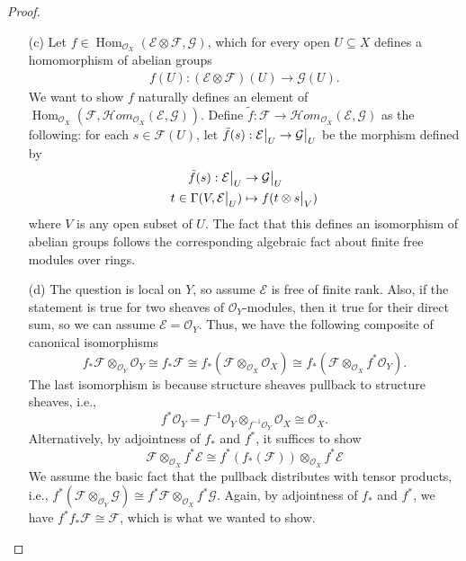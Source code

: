 \documentclass{article}
\newcommand{\fF}{\mathcal{F}}
\newcommand{\fG}{\mathcal{G}}
\newcommand{\fE}{\mathcal{E}}
\newcommand{\fO}{\mathcal{O}}
\DeclareMathOperator{\Hom}{Hom}
\newcommand\restr[2]{{%
  \left.\kern-\nulldelimiterspace %
  #1 %
  \vphantom{\big|} %
  \right|_{#2} %
}}
\begin{document}
\begin{enumerate} [label=\textbf{\arabic*.}, leftmargin=0em]
\begin{proof}
\begin{itemize} [leftmargin=0em]
    \item[(c)] Let $f \in \Hom_{\fO_X}(\fE \otimes \fF, \fG)$, which for every open $U \subseteq X$ defines a homomorphism of abelian groups
    \begin{align*}
        f(U) : (\fE \otimes \fF)(U) \to \fG(U).
    \end{align*}
    We want to show $f$ naturally defines an element of $\Hom_{\fO_X}(\fF, \mathcal{H}om_{\fO_X}(\fE, \fG))$. Define $\tilde{f} : \fF \to \mathcal{H}om_{\fO_X}(\fE, \fG)$ as the following: for each $s \in \fF(U)$, let $\tilde{f}(s) : \restr{\fE}{U} \to \restr{\fG}{U}$ be the morphism defined by
    \begin{align*}
        \tilde{f}(s) : \restr{\fE}{U} & \to \restr{\fG}{U} \\
        t \in \Gamma(V, \restr{\fE}{U}) & \mapsto f(t \otimes \restr{s}{V})
    \end{align*}
    where $V$ is any open subset of $U$. The fact that this defines an isomorphism of abelian groups follows the corresponding algebraic fact about finite free modules over rings.

    \item[(d)] The question is local on $Y$, so assume $\fE$ is free of finite rank. Also, if the statement is true for two sheaves of $\fO_Y$-modules, then it true for their direct sum, so we can assume $\fE = \fO_Y$. Thus, we have the following composite of canonical isomorphisms
    \begin{equation*}
        f_* \fF \otimes_{\fO_Y} \fO_Y \cong f_* \fF \cong f_*(\fF \otimes_{\fO_X} \fO_X) \cong f_*(\fF \otimes_{\fO_X} f^*\fO_Y).
    \end{equation*}
    The last isomorphism is because structure sheaves pullback to structure sheaves, i.e.,
    \begin{equation*}
        f^*\fO_Y = f^{-1}\fO_Y \otimes_{f^{-1}\fO_Y} \fO_X \cong \fO_X.
    \end{equation*}
    Alternatively, by adjointness of $f_*$ and $f^*$, it suffices to show
    \begin{equation*}
        \fF \otimes_{\fO_X} f^* \fE \cong f^*(f_*(\fF)) \otimes_{\fO_X} f^*\fE
    \end{equation*}
    We assume the basic fact that the pullback distributes with tensor products, i.e., $f^*(\fF \otimes_{\fO_Y} \fG) \cong f^* \fF \otimes_{\fO_X} f^* \fG$. Again, by adjointness of $f_*$ and $f^*$, we have $f^* f_* \fF \cong \fF$, which is what we wanted to show.
\end{itemize}
\end{proof}


\end{enumerate}
\end{document}
